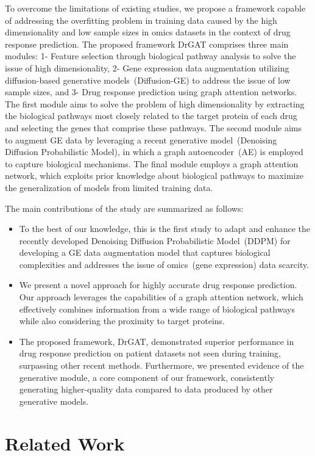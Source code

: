 \documentclass[runningheads]{llncs}
\newcommand{\drdiff}{DrGAT\xspace}
\begin{document}
To overcome the limitations of existing studies, we propose a framework capable of addressing the overfitting problem in training data caused by the high dimensionality and low sample sizes in omics datasets in the context of drug response prediction. The proposed framework \drdiff comprises three main modules: 1- Feature selection
through biological pathway analysis to solve the issue of high
dimensionality, 2- Gene expression data augmentation utilizing diffusion-based
generative models~(Diffusion-GE) to address the issue of low sample
sizes, and 3- Drug response prediction using graph attention
networks. The first module aims to solve the problem of high
dimensionality by extracting the biological pathways most closely
related to the target protein of each drug and selecting the genes
that comprise these pathways. The second module aims to augment GE
data by leveraging a recent generative model~(Denoising Diffusion
Probabilistic Model), in which a graph autoencoder~(AE) is employed
to capture biological mechanisms. The final module employs a graph
attention network, which exploits prior knowledge about biological
pathways to maximize the generalization of models from limited
training data.

The main contributions of the study are summarized as follows:
%
\begin{itemize}
\item To the best of our knowledge, this is the first study to adapt and enhance the recently developed Denoising Diffusion Probabilistic Model~(DDPM) for developing a GE data augmentation model that captures biological complexities and addresses the issue of omics~(gene expression) data scarcity.
\item We present a novel approach for highly accurate drug response prediction. Our approach leverages the capabilities of a graph attention network, which effectively combines information from a wide range of biological pathways while also considering the proximity to target proteins.
\item The proposed framework, \drdiff, demonstrated superior performance in drug response prediction on patient datasets not seen during training, surpassing other recent methods. Furthermore, we presented evidence of the generative module, a core component of our framework, consistently generating higher-quality data compared to data produced by other generative models.
\end{itemize}
    
\section{Related Work}
\end{document}
